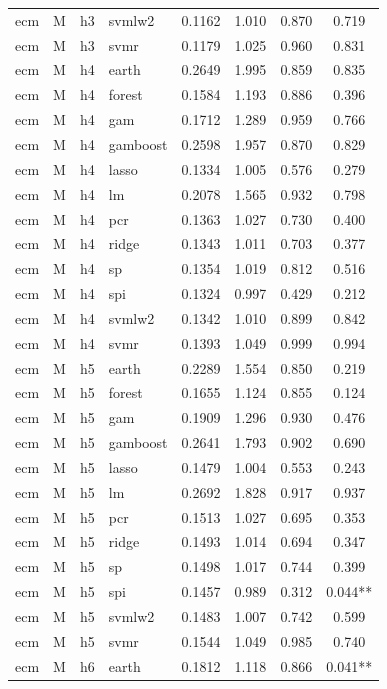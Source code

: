 \begin{ThreePartTable}
\begin{longtable}[t]{llclcccc}
ecm & M & h3 & svmlw2 & 0.1162 & 1.010 & 0.870 & 0.719\\
ecm & M & h3 & svmr & 0.1179 & 1.025 & 0.960 & 0.831\\
\addlinespace
ecm & M & h4 & earth & 0.2649 & 1.995 & 0.859 & 0.835\\
ecm & M & h4 & forest & 0.1584 & 1.193 & 0.886 & 0.396\\
ecm & M & h4 & gam & 0.1712 & 1.289 & 0.959 & 0.766\\
ecm & M & h4 & gamboost & 0.2598 & 1.957 & 0.870 & 0.829\\
ecm & M & h4 & lasso & 0.1334 & 1.005 & 0.576 & 0.279\\
ecm & M & h4 & lm & 0.2078 & 1.565 & 0.932 & 0.798\\
ecm & M & h4 & pcr & 0.1363 & 1.027 & 0.730 & 0.400\\
ecm & M & h4 & ridge & 0.1343 & 1.011 & 0.703 & 0.377\\
ecm & M & h4 & sp & 0.1354 & 1.019 & 0.812 & 0.516\\
ecm & M & h4 & spi & 0.1324 & 0.997 & 0.429 & 0.212\\
ecm & M & h4 & svmlw2 & 0.1342 & 1.010 & 0.899 & 0.842\\
ecm & M & h4 & svmr & 0.1393 & 1.049 & 0.999 & 0.994\\
\addlinespace
ecm & M & h5 & earth & 0.2289 & 1.554 & 0.850 & 0.219\\
ecm & M & h5 & forest & 0.1655 & 1.124 & 0.855 & 0.124\\
ecm & M & h5 & gam & 0.1909 & 1.296 & 0.930 & 0.476\\
ecm & M & h5 & gamboost & 0.2641 & 1.793 & 0.902 & 0.690\\
ecm & M & h5 & lasso & 0.1479 & 1.004 & 0.553 & 0.243\\
ecm & M & h5 & lm & 0.2692 & 1.828 & 0.917 & 0.937\\
ecm & M & h5 & pcr & 0.1513 & 1.027 & 0.695 & 0.353\\
ecm & M & h5 & ridge & 0.1493 & 1.014 & 0.694 & 0.347\\
ecm & M & h5 & sp & 0.1498 & 1.017 & 0.744 & 0.399\\
ecm & M & h5 & spi & 0.1457 & 0.989 & 0.312 & 0.044**\\
ecm & M & h5 & svmlw2 & 0.1483 & 1.007 & 0.742 & 0.599\\
ecm & M & h5 & svmr & 0.1544 & 1.049 & 0.985 & 0.740\\
\addlinespace
ecm & M & h6 & earth & 0.1812 & 1.118 & 0.866 & 0.041**\\

\end{longtable}
\end{ThreePartTable}
